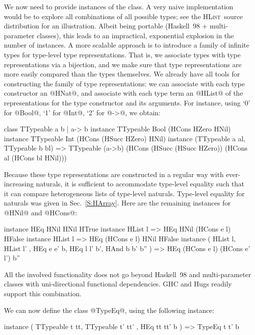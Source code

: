 \documentclass[nocopyrightspace,preprint]{sigplan-proc}
\newcommand{\hwVsTr}[2]{#2}
\newcommand{\HList}{\textsc{HList}}
\begin{document}
We now need to provide instances of the class. A very naive
implementation would be to explore all combinations of all possible
types; \hwVsTr{see~\cite{HList}}{see the \HList\ source distribution}
for an illustration. Albeit being portable (Haskell~98 +
multi-parameter classes), this leads to an impractical, exponential
explosion in the number of instances. A more scalable approach is to
introduce a family of infinite types for type-level type
representations. That is, we associate types with type representations
via a bijection, and we make sure that type representations are more
easily compared than the types themselves. We already have all tools
for constructing the family of type representations: we can associate
with each type constructor an @HNat@, and associate with each type
term an @HList@ of the representations for the type constructor and
its arguments.  For instance, using `0' for @Bool@, `1' for @Int@, `2'
for @->@, we obtain:

\begin{code}
 class TTypeable a b | a-> b
 instance TTypeable Bool (HCons HZero HNil)
 instance TTypeable Int  (HCons (HSucc HZero) HNil)
 instance (TTypeable a al, TTypeable b bl)
  => TTypeable (a->b) (HCons (HSucc (HSucc HZero))
                       (HCons al (HCons bl HNil)))
\end{code}

Because these type representations are constructed in a regular way
with ever-increasing naturals, it is sufficient to accommodate
type-level equality such that it can compare heterogeneous lists of
type-level naturals. Type-level equality for naturals was given in
Sec.~\ref{S:HArray}. Here are the remaining instances for @HNil@ and
@HCons@:

\begin{code}
 instance HEq HNil HNil HTrue
 instance HList l => HEq HNil (HCons e l) HFalse
 instance HList l => HEq (HCons e l) HNil HFalse
 instance ( HList l, HList l'
          , HEq e e' b, HEq l l' b', HAnd b b' b''
          ) => HEq (HCons e l) (HCons e' l') b''
\end{code}

All the involved functionality does not go beyond Haskell~98 and
multi-parameter classes with uni-directional functional dependencies.
GHC and Hugs readily support this combination.

We can now define the class @TypeEq@, using the following instance:

\begin{code}
 instance ( TTypeable t tt, TTypeable t' tt'
          , HEq tt tt' b ) => TypeEq t t' b
\end{code}
\end{document}

